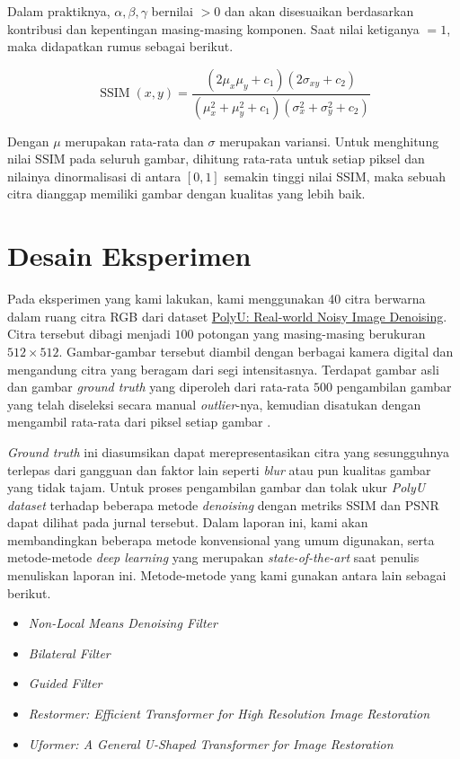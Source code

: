 \documentclass[11pt, a4paper, final]{report}
\begin{document}
Dalam praktiknya, $\alpha, \beta, \gamma$ bernilai $> 0$ dan akan disesuaikan berdasarkan kontribusi dan kepentingan masing-masing komponen. Saat nilai ketiganya $= 1$, maka didapatkan rumus sebagai berikut.

$$
\operatorname{SSIM}(x, y)=\frac{\left(2 \mu_{x} \mu_{y}+c_{1}\right)\left(2 \sigma_{x y}+c_{2}\right)}{\left(\mu_{x}^{2}+\mu_{y}^{2}+c_{1}\right)\left(\sigma_{x}^{2}+\sigma_{y}^{2}+c_{2}\right)}
$$

Dengan $\mu$ merupakan rata-rata dan $\sigma$ merupakan variansi. Untuk menghitung nilai SSIM pada seluruh gambar, dihitung rata-rata untuk setiap piksel dan nilainya dinormalisasi di antara $[0, 1]$ semakin tinggi nilai SSIM, maka sebuah citra dianggap memiliki gambar dengan kualitas yang lebih baik.

 \section{Desain Eksperimen}

Pada eksperimen yang kami lakukan, kami menggunakan 40 citra berwarna dalam ruang citra RGB dari dataset \hyperlink{https://github.com/csjunxu/PolyU-Real-World-Noisy-Images-Dataset}{PolyU: Real-world Noisy Image Denoising}. Citra tersebut dibagi menjadi $100$ potongan yang masing-masing berukuran $512 \times 512$. Gambar-gambar tersebut diambil dengan berbagai kamera digital dan mengandung citra yang beragam dari segi intensitasnya. Terdapat gambar asli dan gambar \textit{ground truth} yang diperoleh dari rata-rata $500$ pengambilan gambar yang telah diseleksi secara manual \textit{outlier}-nya, kemudian disatukan dengan mengambil rata-rata dari piksel setiap gambar \cite{xu2018realworld}.

\textit{Ground truth} ini diasumsikan dapat merepresentasikan citra yang sesungguhnya terlepas dari gangguan dan faktor lain seperti \textit{blur} atau pun kualitas gambar yang tidak tajam. Untuk proses pengambilan gambar dan tolak ukur \textit{PolyU dataset} terhadap beberapa metode \textit{denoising} dengan metriks SSIM dan PSNR dapat dilihat pada jurnal tersebut. Dalam laporan ini, kami akan membandingkan beberapa metode konvensional yang umum digunakan, serta metode-metode \textit{deep learning} yang merupakan \textit{state-of-the-art} saat penulis menuliskan laporan ini. Metode-metode yang kami gunakan antara lain sebagai berikut.

\begin{itemize}[noitemsep]
    \item \textit{Non-Local Means Denoising Filter}
    \item \textit{Bilateral Filter}
    \item \textit{Guided Filter}
    \item \textit{Restormer: Efficient Transformer for High Resolution Image Restoration}
    \item \textit{Uformer: A General U-Shaped Transformer for Image Restoration}
\end{itemize}
\end{document}
